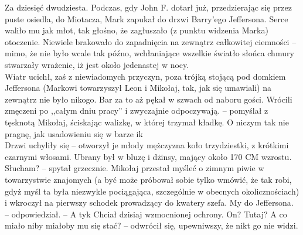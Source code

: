 \documentclass[../MAIN.tex]{subfiles}
\begin{document}
Za dziesięć dwudziesta. Podczas, gdy John F. dotarł już, przedzierając się przez puste osiedla, do Miotacza, Mark zapukał do drzwi Barry’ego Jeffersona. Serce waliło mu jak młot, tak głośno, że zagłuszało (z punktu widzenia Marka) otoczenie. Niewiele brakowało do zapadnięcia na zewnątrz całkowitej ciemności -- mimo, że nie było wcale tak późno, wchłaniające wszelkie światło słońca chmury stwarzały wrażenie, iż jest około jedenastej w nocy. \\
Wiatr ucichł, zaś z niewiadomych przyczyn, poza trójką stojącą pod domkiem Jeffersona (Markowi towarzyszył Leon i Mikołaj, tak, jak się umawiali) na zewnątrz nie było nikogo. Bar za to aż pękał w szwach od naboru gości. Wrócili zmęczeni po ,,całym dniu pracy'' i zwyczajnie odpoczywają. -- pomyślał z tęsknotą Mikołaj, ściskając walizkę, w której trzymał kładkę. O niczym tak nie pragnę, jak usadowieniu się w barze i\3k \\
Drzwi uchyliły się -- otworzył je młody mężczyzna koło trzydziestki, z krótkimi czarnymi włosami. Ubrany był w bluzę i dżinsy, mający około 170 CM wzrostu.
\sx Słucham? -- spytał grzecznie. \qd
Mikołaj przestał myśleć o zimnym piwie w towarzystwie znajomych (a być może próbował sobie tylko wmówić, że tak robi, gdyż myśl ta była niezwykle pociągająca, szczególnie w obecnych okolicznościach) i wkroczył na pierwszy schodek prowadzący do kwatery szefa.
\sx My do Jeffersona. -- odpowiedział. -- A ty\3k
\xx Chciał dzisiaj wzmocnionej ochrony.
\xx On? Tutaj? A co miało niby miałoby mu się stać? -- odwrócił się, upewniwszy, że nikt go nie widzi.
\qd
\end{document}
